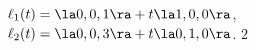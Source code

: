 {$\ell_1(t) = \la 0,0,1\ra + t\la 1,0,0\ra$,\\
$\ell_2(t) = \la 0,0,3\ra + t\la 0,1,0\ra$.
}
{$2$
}

